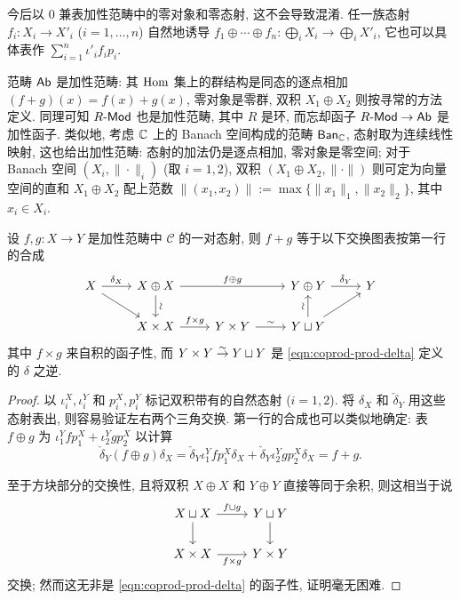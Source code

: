 今后以 $0$ 兼表加性范畴中的零对象和零态射, 这不会导致混淆. 任一族态射 $f_i: X_i \to X'_i$ ($i = 1, \ldots, n$) 自然地诱导 $f_1 \oplus \cdots \oplus f_n: \bigoplus_i X_i \to \bigoplus_i X'_i$, 它也可以具体表作 $\sum_{i=1}^n \iota'_i f_i p_i$.

\begin{example}\label{eg:additive-category}
	范畴 $\mathsf{Ab}$ 是加性范畴: 其 $\operatorname{Hom}$ 集上的群结构是同态的逐点相加 $(f + g)(x) = f(x) + g(x)$, 零对象是零群, 双积 $X_1 \oplus X_2$ 则按寻常的方法定义. 同理可知 $R\text{-}\mathsf{Mod}$ 也是加性范畴, 其中 $R$ 是环, 而忘却函子 $R\text{-}\mathsf{Mod} \to \mathsf{Ab}$ 是加性函子. 类似地, 考虑 $\mathbb{C}$ 上的 Banach 空间构成的范畴 $\mathsf{Ban}_{\mathbb{C}}$, 态射取为连续线性映射, 这也给出加性范畴: 态射的加法仍是逐点相加, 零对象是零空间; 对于 Banach 空间 $(X_i, \|\cdot\|_i)$ (取 $i=1,2$), 双积 $(X_1 \oplus X_2, \|\cdot\|)$ 则可定为向量空间的直和 $X_1 \oplus X_2$ 配上范数 $\|(x_1, x_2)\| := \max\{ \|x_1\|_1, \|x_2\|_2 \}$, 其中 $x_i \in X_i$.
\end{example}

\begin{proposition}\label{prop:additive-cat-addition}
	设 $f,g: X \to Y$ 是加性范畴中 $\mathcal{C}$ 的一对态射, 则 $f + g$ 等于以下交换图表按第一行的合成
	\[\begin{tikzcd}
	X \arrow[r, "\delta_X"] \arrow[rd] & X \oplus X \arrow[rr, "f \oplus g"] \arrow[d, "\sim" sloped] & & Y \oplus Y \arrow[r, "\check{\delta}_Y"] & Y \\
	& X \times X \arrow[r, "f \times g"] & Y \times Y \arrow[r, "\sim"] & Y \sqcup Y \arrow[ru] \arrow[u, "\sim" sloped] &
	\end{tikzcd}\]
	其中 $f \times g$ 来自积的函子性, 而 $Y \times Y \stackrel{\sim}{\rightarrow} Y \sqcup Y$ 是 \eqref{eqn:coprod-prod-delta} 定义的 $\delta$ 之逆.
\end{proposition}
\begin{proof}
	以 $\iota_i^X, \iota_i^Y$ 和 $p_i^X, p_i^Y$ 标记双积带有的自然态射 ($i=1,2$). 将 $\delta_X$ 和 $\check{\delta}_Y$ 用这些态射表出, 则容易验证左右两个三角交换. 第一行的合成也可以类似地确定: 表 $f \oplus g$ 为 $\iota_1^Y f p^X_1 + \iota_2^Y g p^X_2$ 以计算
	\begin{equation}
		\check{\delta}_Y (f \oplus g) \delta_X = \check{\delta}_Y \iota_1^Y f p^X_1 \delta_X + \check{\delta}_Y \iota_2^Y g p^X_2 \delta_X
		= f + g.
	\end{equation}
	
	至于方块部分的交换性, 且将双积 $X \oplus X$ 和 $Y \oplus Y$ 直接等同于余积, 则这相当于说
	\[\begin{tikzcd}
		X \sqcup X \arrow[r, "{f \sqcup g}"] \arrow[d] & Y \sqcup Y \arrow[d] \\
		X \times X \arrow[r, "{f \times g}"'] & Y \times Y
	\end{tikzcd}\]
	交换; 然而这无非是 \eqref{eqn:coprod-prod-delta} 的函子性, 证明毫无困难.
\end{proof}

